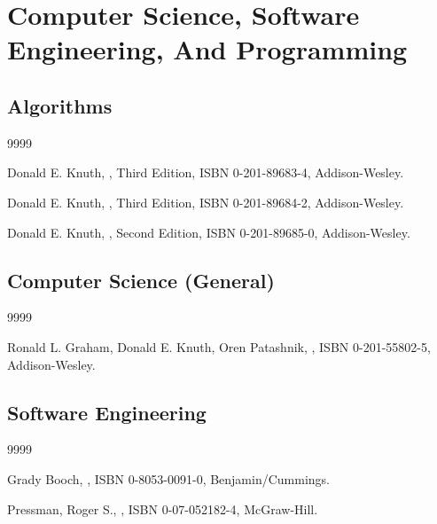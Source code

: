 
\section*{Computer Science, Software Engineering, And Programming}

\subsection*{Algorithms}

\begin{thecustombibliography}{9999}

Donald E. Knuth,
,
Third Edition, ISBN 0-201-89683-4, Addison-Wesley.

Donald E. Knuth,
,
Third Edition,
ISBN 0-201-89684-2, Addison-Wesley.

Donald E. Knuth,
,
Second Edition,
ISBN 0-201-89685-0, Addison-Wesley.

\end{thecustombibliography}

\subsection*{Computer Science (General)}

\begin{thecustombibliography}{9999}

Ronald L. Graham,
Donald E. Knuth,
Oren Patashnik,
,
ISBN 0-201-55802-5, Addison-Wesley.

\end{thecustombibliography}


\subsection*{Software Engineering}

\begin{thecustombibliography}{9999}

Grady Booch, 
,
ISBN 0-8053-0091-0, Benjamin/Cummings.

Pressman, Roger S., 
,
ISBN 0-07-052182-4, McGraw-Hill.

\end{thecustombibliography}

